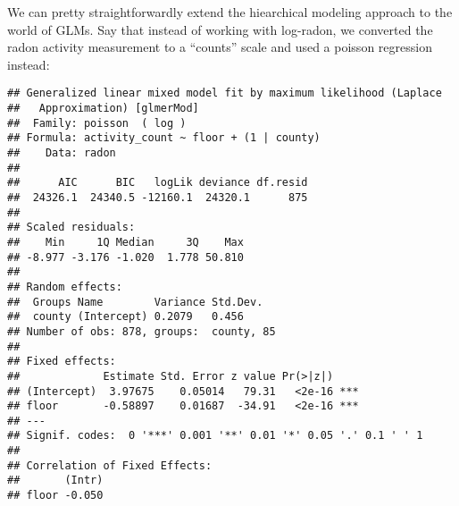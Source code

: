 \documentclass[
]{article}
\newenvironment{Shaded}{\begin{snugshade}}{\end{snugshade}}
\newcommand{\AttributeTok}[1]{\textcolor[rgb]{0.77,0.63,0.00}{#1}}
\newcommand{\DecValTok}[1]{\textcolor[rgb]{0.00,0.00,0.81}{#1}}
\newcommand{\FunctionTok}[1]{\textcolor[rgb]{0.00,0.00,0.00}{#1}}
\newcommand{\NormalTok}[1]{#1}
\newcommand{\OtherTok}[1]{\textcolor[rgb]{0.56,0.35,0.01}{#1}}
\newcommand{\SpecialCharTok}[1]{\textcolor[rgb]{0.00,0.00,0.00}{#1}}
\begin{document}
We can pretty straightforwardly extend the hiearchical modeling approach
to the world of GLMs. Say that instead of working with log-radon, we
converted the radon activity measurement to a ``counts'' scale and used
a poisson regression instead:

\begin{Shaded}
\end{Shaded}

\begin{verbatim}
## Generalized linear mixed model fit by maximum likelihood (Laplace
##   Approximation) [glmerMod]
##  Family: poisson  ( log )
## Formula: activity_count ~ floor + (1 | county)
##    Data: radon
## 
##      AIC      BIC   logLik deviance df.resid 
##  24326.1  24340.5 -12160.1  24320.1      875 
## 
## Scaled residuals: 
##    Min     1Q Median     3Q    Max 
## -8.977 -3.176 -1.020  1.778 50.810 
## 
## Random effects:
##  Groups Name        Variance Std.Dev.
##  county (Intercept) 0.2079   0.456   
## Number of obs: 878, groups:  county, 85
## 
## Fixed effects:
##             Estimate Std. Error z value Pr(>|z|)    
## (Intercept)  3.97675    0.05014   79.31   <2e-16 ***
## floor       -0.58897    0.01687  -34.91   <2e-16 ***
## ---
## Signif. codes:  0 '***' 0.001 '**' 0.01 '*' 0.05 '.' 0.1 ' ' 1
## 
## Correlation of Fixed Effects:
##       (Intr)
## floor -0.050
\end{verbatim}
\end{document}
